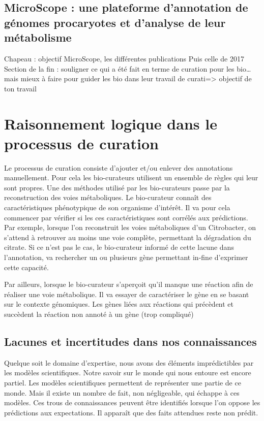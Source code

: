 \begin{refsection}
    \subsection{MicroScope : une plateforme d’annotation de génomes procaryotes et d’analyse de leur métabolisme}
    
    Chapeau : objectif MicroScope, les différentes publications
    Puis celle de 2017
    Section de la fin : souligner ce qui a été fait en terme de curation pour les bio… mais mieux à faire pour guider les bio dans leur travail de curati=> objectif de ton travail
    

    \section{Raisonnement logique dans le processus de curation}
    
    Le processus de curation consiste d’ajouter et/ou enlever des annotations manuellement. Pour cela les bio-curateurs utilisent un ensemble de règles qui leur sont propres. Une des méthodes utilisé par les bio-curateurs passe par la reconstruction des voies métaboliques. Le bio-curateur connaît des caractéristiques phénotypique de son organisme d’intérêt. Il va pour cela commencer par vérifier si les ces caractéristiques sont corrélés aux prédictions. Par exemple, lorsque l’on reconstruit les voies métaboliques d’un Citrobacter, on s’attend à retrouver au moins une voie complète, permettant la dégradation du citrate. Si ce n’est pas le cas, le bio-curateur informé de cette lacune dans l’annotation, va rechercher un ou plusieurs gène permettant in-fine d’exprimer cette capacité.
    
    Par ailleurs, lorsque le bio-curateur s’aperçoit qu’il manque une réaction afin de réaliser une voie métabolique. Il va essayer de caractériser le gène en se basant sur le contexte génomiques. Les gènes liées aux réactions qui précèdent et succèdent la réaction non annoté à un gène (trop compliqué)
    
    \subsection{Lacunes et incertitudes dans nos connaissances}
    
    Quelque soit le domaine d’expertise, nous avons des éléments imprédictibles par les modèles scientifiques. Notre savoir sur le monde qui nous entoure est encore partiel. Les modèles scientifiques permettent de représenter une partie de ce monde. Mais il existe un nombre de fait, non négligeable, qui échappe à ces  modèles. Ces trous de connaissances peuvent être identifiés lorsque l’on oppose les prédictions aux expectations. Il apparaît que des faits attendues reste non prédit.
    

\end{refsection}
